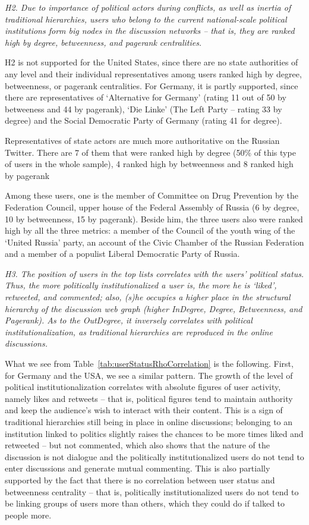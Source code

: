 \textit{H2. Due to importance of political actors during conflicts, as well as inertia of traditional hierarchies, users who belong to the current national-scale political institutions form big nodes in the discussion networks -- that is, they are ranked high by degree, betweenness, and pagerank centralities.}

H2 is not supported for the United States, since there are no state authorities of any level and their individual representatives among users ranked high by degree, betweenness, or pagerank centralities. For Germany, it is partly supported, since there are representatives of ‘Alternative for Germany’ (rating 11 out of 50 by betweeness and 44 by pagerank), ‘Die Linke’ (The Left Party -- rating 33 by degree) and the Social Democratic Party of Germany (rating 41 for degree).

Representatives of state actors are much more authoritative on the Russian Twitter. There are 7 of them that were ranked high by degree (50\% of this type of users in the whole sample), 4 ranked high by betweenness and 8 ranked high by pagerank

Among these users, one is the member of Committee on Drug Prevention by the Federation Council, upper house of the Federal Assembly of Russia (6 by degree, 10 by betweenness, 15 by pagerank). Beside him, the three users also were ranked high by all the three metrics: a member of the Council of the youth wing of the ‘United Russia’ party, an account of the Civic Chamber of the Russian Federation and a member of a populist Liberal Democratic Party of Russia.

\textit{H3. The position of users in the top lists correlates with the users’ political status. Thus, the more politically institutionalized a user is, the more he is ‘liked’, retweeted, and commented; also, (s)he occupies a higher place in the structural hierarchy of the discussion web graph (higher InDegree, Degree, Betweenness, and Pagerank). As to the OutDegree, it inversely correlates with political institutionalization, as traditional hierarchies are reproduced in the online discussions.}

What we see from Table~\cref{tab:userStatusRhoCorrelation} is the following. First, for Germany and the USA, we see a similar pattern. The growth of the level of political institutionalization correlates with absolute figures of user activity, namely likes and retweets -- that is, political figures tend to maintain authority and keep the audience’s wish to interact with their content. This is a sign of traditional hierarchies still being in place in online discussions; belonging to an institution linked to politics slightly raises the chances to be more times liked and retweeted -- but not commented, which also shows that the nature of the discussion is not dialogue and the politically institutionalized users do not tend to enter discussions and generate mutual commenting. This is also partially supported by the fact that there is no correlation between user status and betweenness centrality -- that is, politically institutionalized users do not tend to be linking groups of users more than others, which they could do if talked to people more.

